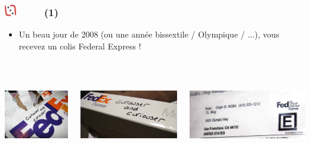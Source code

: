 \documentclass[slidetop,11pt]{beamer}
\def\moreInFrameTitleLeftt{\includegraphics[height=0.5cm]{img/ligueludique-0.png}~~~~~}
\begin{document}
\subsubsection{\sectionPartIIaIV} %
\begin{frame}
	\frametitle{\moreInFrameTitleLeftt \sectionPartIIaIV  (1) }
	\begin{itemize}
		\item Un beau jour de 2008 (ou une ann{\'e}e bissextile / Olympique / ...), vous recevez un colis Federal Express !
	\end{itemize}
	
	\begin{columns}[T]
		\begin{column}[T]{4.1cm}
			\includegraphics[height=4.05cm]{img/argTheLostRing/2298573987_7e11345d9d_o.jpg}
		\end{column}
		\begin{column}[T]{4.1cm}
			\includegraphics[height=4.05cm]{img/argTheLostRing/2299370570_92295d5e5f_o.jpg}
		\end{column}
		\begin{column}[T]{4.1cm}
			\includegraphics[height=4.05cm]{img/argTheLostRing/2298573877_5b74530a72_o.jpg}
		\end{column}
	\end{columns}
\end{frame} 
\end{document}
